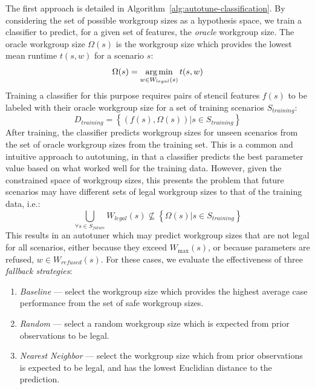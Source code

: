 The first approach is detailed in
Algorithm~\ref{alg:autotune-classification}. By considering the set of
possible workgroup sizes as a hypothesis space, we train a classifier
to predict, for a given set of features, the \emph{oracle} workgroup
size. The oracle workgroup size $\Omega(s)$ is the workgroup size
which provides the lowest mean runtime $t(s,w)$ for a scenario $s$:
%
\begin{equation}
  \Omega(s) = \operatorname*{arg\,min}_{w \in W_{legal}(s)} t(s,w)
\end{equation}
%
Training a classifier for this purpose requires pairs of stencil
features $f(s)$ to be labeled with their oracle workgroup size for a
set of training scenarios $S_{training}$:
%
\begin{equation}
  D_{training} = \left\{ \left(f(s), \Omega(s)\right) | s \in S_{training} \right\}
\end{equation}
%
After training, the classifier predicts workgroup sizes for unseen
scenarios from the set of oracle workgroup sizes from the training
set. This is a common and intuitive approach to autotuning, in that a
classifier predicts the best parameter value based on what worked well
for the training data. However, given the constrained space of
workgroup sizes, this presents the problem that future scenarios may
have different sets of legal workgroup sizes to that of the training
data, i.e.:
%
\begin{equation}
  \bigcup_{\forall s \in S_{future}} W_{legal}(s) \nsubseteq \left\{ \Omega(s) | s \in S_{training} \right\}
\end{equation}
%
This results in an autotuner which may predict workgroup sizes that
are not legal for all scenarios, either because they exceed
$W_{\max}(s)$, or because parameters are refused,
$w \in W_{refused}(s)$. For these cases, we evaluate the effectiveness
of three \emph{fallback strategies}:
%
\begin{enumerate}
\item \emph{Baseline} --- select the workgroup size which provides the
  highest average case performance from the set of safe workgroup sizes.
\item \emph{Random} --- select a random workgroup size which is
  expected from prior observations to be legal.
\item \emph{Nearest Neighbor} --- select the workgroup size which
  from prior observations is expected to be legal, and has the lowest
  Euclidian distance to the prediction.
\end{enumerate}


